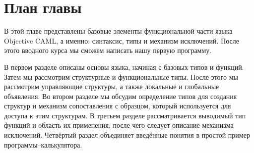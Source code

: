 \section{План главы}
\label{sec:chapter_outline_2}

В этой главе представлены базовые элементы функциональной части языка Objective
CAML, а именно: синтаксис, типы и механизм исключений. После этого вводного
курса мы сможем написать нашу первую программу.

В первом разделе описаны основы языка, начиная с базовых типов и функций. Затем
мы рассмотрим структурные и функциональные типы. После этого мы рассмотрим
управляющие структуры, а также локальные и глобальные объявления. Во втором
разделе мы обсудим определение типов для создания структур и механизм
сопоставления с образцом, который используется для доступа к этим структурам. В
третьем разделе рассматривается выводимый тип функций и область их применения,
после чего следует описание механизма исключений. Четвёртый раздел объединяет
введённые понятия в простой пример программы--калькулятора.
